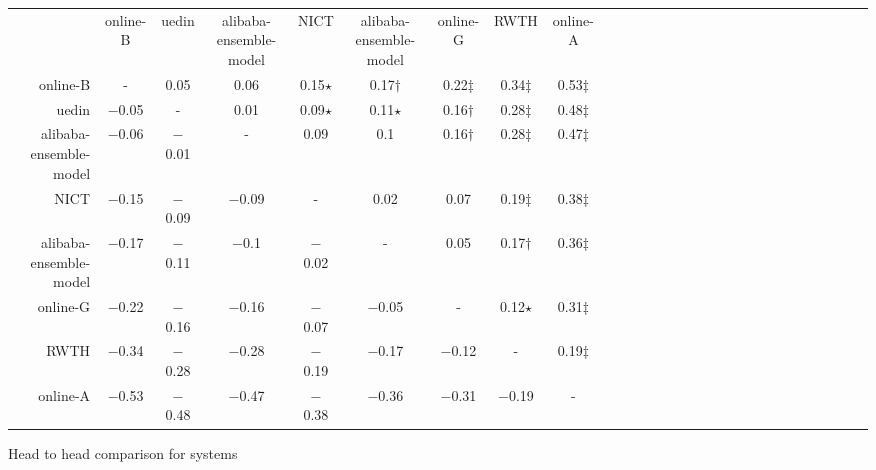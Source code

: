 \begin{tabular}{rccccccccccccccccccccccccccc}

 & online-B & uedin & alibaba-ensemble-model & NICT & alibaba-ensemble-model & online-G & RWTH & online-A \\ 
online-B & - &    0.05 &    0.06 &    0.15$\star$ &    0.17$\dagger$ &    0.22$\ddagger$ &    0.34$\ddagger$ &    0.53$\ddagger$ \\ 
uedin & $-$0.05 & - &    0.01 &    0.09$\star$ &    0.11$\star$ &    0.16$\dagger$ &    0.28$\ddagger$ &    0.48$\ddagger$ \\ 
alibaba-ensemble-model & $-$0.06 & $-$0.01 & - &    0.09 &    0.1 &    0.16$\dagger$ &    0.28$\ddagger$ &    0.47$\ddagger$ \\ 
NICT & $-$0.15 & $-$0.09 & $-$0.09 & - &    0.02 &    0.07 &    0.19$\ddagger$ &    0.38$\ddagger$ \\ 
alibaba-ensemble-model & $-$0.17 & $-$0.11 & $-$0.1 & $-$0.02 & - &    0.05 &    0.17$\dagger$ &    0.36$\ddagger$ \\ 
online-G & $-$0.22 & $-$0.16 & $-$0.16 & $-$0.07 & $-$0.05 & - &    0.12$\star$ &    0.31$\ddagger$ \\ 
RWTH & $-$0.34 & $-$0.28 & $-$0.28 & $-$0.19 & $-$0.17 & $-$0.12 & - &    0.19$\ddagger$ \\ 
online-A & $-$0.53 & $-$0.48 & $-$0.47 & $-$0.38 & $-$0.36 & $-$0.31 & $-$0.19 & - \\ 


\end{tabular}
\caption{Head to head comparison for \enTR systems}
\label{pairwise-entr}


